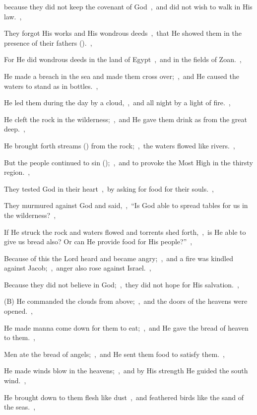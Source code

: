 \documentclass[12pt,twoside,a5paper]{article}
\begin{document}
\begin{normalparskip}
  because they did not keep the covenant of God~\sep\ and did not wish to walk in His law.~\sep

  They forgot His works and His wondrous deeds~\sep\ that He showed them in the presence of their fathers ().~\sep

  For He did wondrous deeds in the land of Egypt~\sep\ and in the fields of Zoan.~\sep

  He made a breach in the sea and made them cross over;~\sep\ and He caused the waters to stand as in bottles.~\sep

  He led them during the day by a cloud,~\sep\ and all night by a light of fire.~\sep

  He cleft the rock in the wilderness;~\sep\ and He gave them drink as from the great deep.~\sep

  He brought forth streams () from the rock;~\sep\ the waters flowed like rivers.~\sep

  But the people continued to sin ();~\sep\ and to provoke the Most High in the thirsty region.~\sep

  They tested God in their heart~\sep\ by asking for food for their souls.~\sep

  They murmured against God and said,~\sep\ ``Is God able to spread tables for us in the wilderness?~\sep

  If He struck the rock and waters flowed and torrents shed forth,~\sep\ is He able to give us bread also? Or can He provide food for His people?''~\sep

  Because of this the Lord heard and became angry;~\sep\ and a fire was kindled against Jacob;~\sep\ anger also rose against Israel.~\sep

  Because they did not believe in God;~\sep\ they did not hope for His salvation.~\sep

  (B) He commanded the clouds from above;~\sep\ and the doors of the heavens were opened.~\sep

  He made manna come down for them to eat;~\sep\ and He gave the bread of heaven to them.~\sep

  Men ate the bread of angels;~\sep\ and He sent them food to satisfy them.~\sep

  He made winds blow in the heavens;~\sep\ and by His strength He guided the south wind.~\sep

  He brought down to them flesh like dust~\sep\ and feathered birds like the sand of the seas.~\sep


\end{normalparskip}
\end{document}

